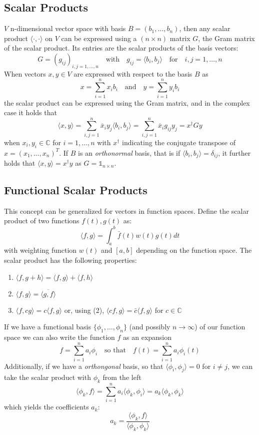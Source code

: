 \subsection{Scalar Products}
$V$ n-dimensional vector space with basis $B = (b_1, \dots, b_n)$, then any scalar product $\langle\cdot,\cdot\rangle$ on $V$ can be expressed using a $(n \times n)$ matrix $G$, the Gram matrix of the scalar product. Its entries are the scalar products of the basis vectors:
$$ G = (g_{ij})_{i,j=1,\dots,n} \quad \text{with} 
  \quad g_{ij} = \langle b_i, b_j \rangle \quad \text{for}
  \quad i,j = 1,\dots, n $$
When vectors $x,y \in V$ are expressed with respect to the basis $B$ as
$$ x = \sum_{i=1}^n x_i b_i \quad \text{and} \quad y = \sum_{i=1}^n y_i b_i $$
the scalar product can be expressed using the Gram matrix, and in the complex case it holds that
$$ \langle x, y \rangle = \sum^n_{i,j=1} \bar{x}_i y_j \langle b_i, b_j \rangle 
  =\sum^n_{i,j=1} \bar{x}_i g_{ij} y_j = x^\dagger G y$$
when $x_i,y_i \in \mathbb{C}$ for $i=1,\dots,n$ with $x^\dagger$ indicating the conjugate transpose of $x = (x_1, \dots, x_n)^T$. If $B$ is an \textit{orthonormal} basis, that is if $\langle b_i, b_j \rangle = \delta_{ij}$, it further holds that $\langle x,y \rangle = x^\dagger y$ as $G = \mathbb{1}_{n \times n}$.


\subsection{Functional Scalar Products}
This concept can be generalized for vectors in function spaces. Define the scalar product of two functions $f(t), g(t)$ as:
$$ \langle f, g \rangle = \int_a^b \bar{f}(t) w(t) g(t) dt $$
with weighting function $w(t)$ and $[a,b]$ depending on the function space. The scalar product has the following properties:
\begin{enumerate}
    \item $\langle f, g + h \rangle = \langle f,g \rangle + \langle f,h \rangle$
    \item $\langle f, g \rangle = \overline{\langle g, f \rangle}$
    \item $\langle f, cg \rangle = c \langle f,g \rangle$ or, using (2),
        $\langle cf,g \rangle = \bar{c} \langle f,g \rangle$ for $c \in \mathbb{C}$
\end{enumerate}
If we have a functional basis $\{\phi_1, \dots , \phi_n\}$ (and possibly $n \to \infty$) of our function space we can also write the function $f$ as an expansion
$$ f = \sum_{i=1}^n a_i \phi_i \quad \text{so that} \quad
  f(t) = \sum_{i=1}^n a_i \phi_i (t)$$
Additionally, if we have a \textit{orthongonal} basis, so that $\langle \phi_i, \phi_j \rangle = 0$ for $i \neq j$, we can take the scalar product with $\phi_k$ from the left
$$ \langle \phi_k, f \rangle = \sum_{i=1}^n a_i \langle \phi_k, \phi_i \rangle =
  a_k \langle \phi_k, \phi_k \rangle $$
which yields the coefficients $a_k$: 
$$ a_k = \frac{\langle \phi_k, f \rangle}{\langle \phi_k, \phi_k \rangle}$$

